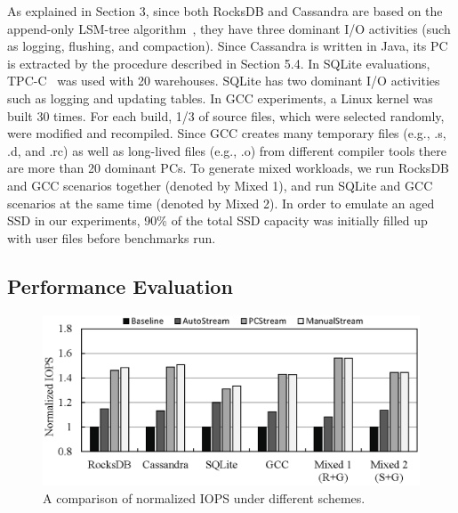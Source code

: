 As explained in Section 3, since both RocksDB and Cassandra are based on the
append-only LSM-tree algorithm~\cite{LSM}, they have three dominant I/O 
activities (such as logging, flushing, and compaction).
Since Cassandra is written in Java, its PC is extracted by the procedure
described in Section 5.4.
In SQLite evaluations, TPC-C~\cite{TPCC} was used with 20 warehouses.  
SQLite has two dominant I/O activities such as logging and updating tables. 
In GCC experiments, a Linux kernel was built 30 times.
For each build, 1/3 of source files, which were selected randomly,
were modified and recompiled.  
Since GCC creates many temporary files (e.g., .s, .d, and .rc) 
as well as long-lived files (e.g., .o) from different compiler tools
there are more than 20 dominant PCs.  
To generate mixed workloads, we run RocksDB and GCC scenarios together (denoted by
Mixed 1), and run SQLite and GCC scenarios at the same time (denoted by Mixed
2).
In order to emulate an aged SSD in our experiments,
90\% of the total SSD capacity was initially filled up
with user files before benchmarks run.

\vspace{-10pt}
\subsection{Performance Evaluation}
\vspace{-5pt}

\begin{figure}[t]
	\centering
	\includegraphics[width=0.9\linewidth]{figure/iops}
	\caption{A comparison of normalized IOPS under different schemes.}
	\vspace{-15pt}
	\label{fig:iops}
	\vspace{-5pt}
\end{figure}

